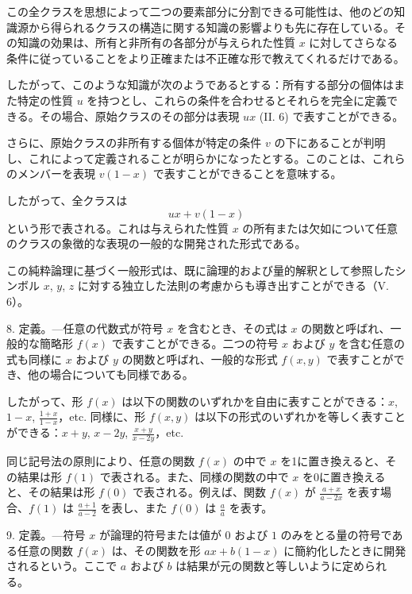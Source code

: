 \documentclass[a4paper,11pt,openany]{ltjsbook}
\begin{document}
この全クラスを思想によって二つの要素部分に分割できる可能性は、他のどの知識源から得られるクラスの構造に関する知識の影響よりも先に存在している。その知識の効果は、所有と非所有の各部分が与えられた性質 \( x \) に対してさらなる条件に従っていることをより正確または不正確な形で教えてくれるだけである。

したがって、このような知識が次のようであるとする：所有する部分の個体はまた特定の性質 \( u \) を持つとし、これらの条件を合わせるとそれらを完全に定義できる。その場合、原始クラスのその部分は表現 \( ux \) (II. 6) で表すことができる。

さらに、原始クラスの非所有する個体が特定の条件 \( v \) の下にあることが判明し、これによって定義されることが明らかになったとする。このことは、これらのメンバーを表現 \( v(1 - x) \) で表すことができることを意味する。

したがって、全クラスは
\[
ux + v(1 - x)
\]
という形で表される。これは与えられた性質 \( x \) の所有または欠如について任意のクラスの象徴的な表現の一般的な開発された形式である。

この純粋論理に基づく一般形式は、既に論理的および量的解釈として参照したシンボル \( x \), \( y \), \( z \) に対する独立した法則の考慮からも導き出すことができる（V. 6）。

8. 定義。---任意の代数式が符号 \( x \) を含むとき、その式は \( x \) の関数と呼ばれ、一般的な簡略形 \( f(x) \) で表すことができる。二つの符号 \( x \) および \( y \) を含む任意の式も同様に \( x \) および \( y \) の関数と呼ばれ、一般的な形式 \( f(x, y) \) で表すことができ、他の場合についても同様である。

したがって、形 \( f(x) \) は以下の関数のいずれかを自由に表すことができる：\( x \), \( 1 - x \), \( \frac{1 + x}{1 - x} \)，etc. 同様に、形 \( f(x, y) \) は以下の形式のいずれかを等しく表すことができる：\( x + y \), \( x - 2y \), \( \frac{x + y}{x - 2y} \)，etc.

同じ記号法の原則により、任意の関数 \( f(x) \) の中で \( x \) を1に置き換えると、その結果は形 \( f(1) \) で表される。また、同様の関数の中で \( x \) を0に置き換えると、その結果は形 \( f(0) \) で表される。例えば、関数 \( f(x) \) が \( \frac{a + x}{a - 2x} \) を表す場合、\( f(1) \) は \( \frac{a + 1}{a - 2} \) を表し、また \( f(0) \) は \( \frac{a}{a} \) を表す。

9. 定義。---符号 \( x \) が論理的符号または値が \( 0 \) および \( 1 \) のみをとる量の符号である任意の関数 \( f(x) \) は、その関数を形 \( ax + b(1 - x) \) に簡約化したときに開発されるという。ここで \( a \) および \( b \) は結果が元の関数と等しいように定められる。
\end{document}
